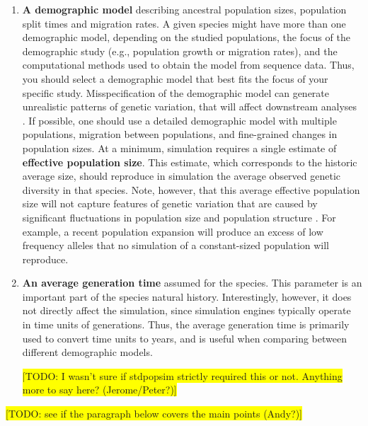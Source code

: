 \documentclass[hidelinks]{article}
\begin{document}
\begin{enumerate}
\item
  \textbf{A demographic model} describing ancestral population sizes, population split times and migration rates. A given species might have more than one demographic model, depending on the studied populations, the focus of the demographic study (e.g., population growth or migration rates), and the computational methods used to obtain the model from sequence data. Thus, you should select a demographic model that best fits the focus of your specific study. Misspecification of the demographic model can generate unrealistic patterns of genetic variation, that will affect downstream analyses \citep[e.g.,][]{Navascues2009}. If possible, one should use a detailed demographic model with multiple populations, migration between populations, and fine-grained changes in population sizes. At a minimum, simulation requires a single estimate of \textbf{effective population size}. This estimate, which corresponds to the historic average size, should reproduce in simulation the average observed genetic diversity in that species. Note, however, that this average effective population size will not capture features of genetic variation that are caused by significant fluctuations in population size and population structure \citep{MacLeod2013}. For example, a recent population expansion will produce
  an excess of low frequency alleles that no simulation of a constant-sized
  population will reproduce.

\item
  \textbf{An average generation time} assumed for the species. 
  This parameter is an important part of the species natural history.
  Interestingly, however, it does not directly affect the simulation, since 
  simulation engines typically operate in time units of generations. Thus, the average generation time is primarily used to convert time units to years, and is useful when comparing between different demographic models.
  
  \colorbox{yellow}{[TODO: I wasn't sure if stdpopsim strictly required this or not. Anything more to say here? (Jerome/Peter?)]}
  
\end{enumerate}

\colorbox{yellow}{[TODO: see if the paragraph below covers the main points (Andy?)]}
\end{document}
